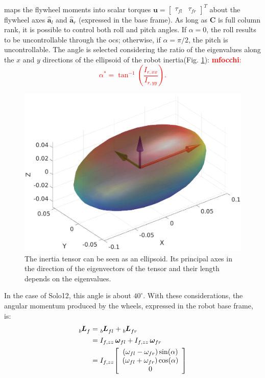 \documentclass[sensors,article,submit,pdftex,moreauthors]{Definitions/mdpi}
\newcommand{\MF}[1]{\textcolor{red}{\textbf{mfocchi}: #1}}
\begin{document}
maps the flywheel moments into scalar torques $\bm{u} = \left[\begin{array}{cc} \tau_{fl} & \tau_{fr} \end{array} \right]^T$ about the flywheel axes $\hat{\bm{a}}_l$ and $\hat{\bm{a}}_r$ (expressed in the base frame).
As long as $\bm{C}$ is full column rank, it is possible to control both roll and pitch angles. If $\alpha = 0$, the roll results to be uncontrollable through the \gls{ocs}; otherwise, if $\alpha = \pi/2$, the pitch is uncontrollable. 
The angle is selected considering the ratio of the eigenvalues along the $x$ and $y$ directions of the ellipsoid of the robot inertia(Fig. \ref{fig:ellipsoid}):
\MF{\begin{equation}
\alpha^{*}=\tan^{-1}\left(\dfrac{I_{r, xx}}{I_{r, yy}}\right).
\end{equation}}
\begin{figure}[t]
	\centering
	\includegraphics[width=1\linewidth]{figures/inertiaEllipsoid.eps}
	\caption{\small The inertia tensor can be seen as an ellipsoid. Its principal axes in the direction of the eigenvectors of the tensor and their length depends on the eigenvalues.}
	\label{fig:ellipsoid}
\end{figure}
In the case of Solo12, this angle is about $40^{\circ}$. With these considerations, the angular momentum produced by the wheels, expressed in the robot base frame, is:
\begin{equation}
\begin{split}
\tensor[_b]{\bm{L}}{_f} &= \tensor[_b]{\bm{L}}{_{fl}} + \tensor[_b]{\bm{L}}{_{fr}} \\
&=I_{f, zz} \, \bm{\omega}_{fl} + I_{f, zz} \, \bm{\omega}_{fr}\\
&=I_{f, zz}
\left[\begin{array}{c}
\left(\omega_{fl} - \omega_{fr}\right)\sin(\alpha) \\ 
\left(\omega_{fl} +  \omega_{fr}\right)\cos(\alpha) \\
0
\end{array}\right]
\end{split}
\label{eq:bLf}
\end{equation}
\end{document}
